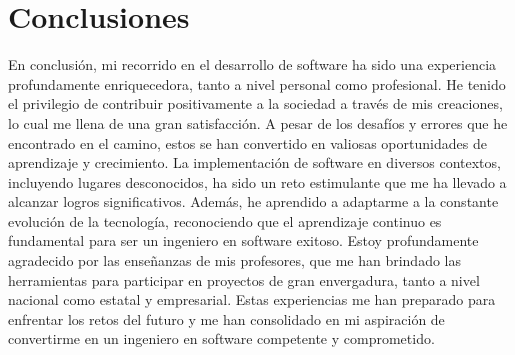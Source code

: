 \documentclass[protocolo.tex]{subfiles}
\begin{document}
\section{Conclusiones}
En conclusión, mi recorrido en el desarrollo de software ha sido una experiencia
profundamente enriquecedora, tanto a nivel personal como profesional. He tenido el
privilegio de contribuir positivamente a la sociedad a través de mis creaciones, lo cual me
llena de una gran satisfacción. A pesar de los desafíos y errores que he encontrado en el
camino, estos se han convertido en valiosas oportunidades de aprendizaje y crecimiento.
La implementación de software en diversos contextos, incluyendo lugares desconocidos, ha
sido un reto estimulante que me ha llevado a alcanzar logros significativos. Además, he
aprendido a adaptarme a la constante evolución de la tecnología, reconociendo que el
aprendizaje continuo es fundamental para ser un ingeniero en software exitoso.
Estoy profundamente agradecido por las enseñanzas de mis profesores, que me han
brindado las herramientas para participar en proyectos de gran envergadura, tanto a nivel
nacional como estatal y empresarial. Estas experiencias me han preparado para enfrentar
los retos del futuro y me han consolidado en mi aspiración de convertirme en un ingeniero
en software competente y comprometido.
\end{document}
